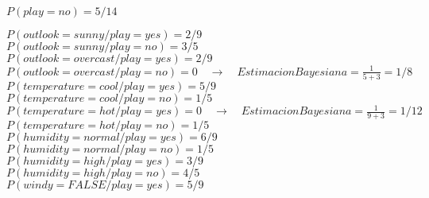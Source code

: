 \documentclass{article}
\begin{document}
\hspace{1cm} $P(play = no) = 5/14$ \\

\vspace{0.5cm}

\hspace{1cm} $P(outlook = sunny / play = yes) = 2/9 $ \\

\hspace{1cm} $P(outlook = sunny / play = no) =  3/5$ \\

\hspace{1cm} $P(outlook = overcast / play = yes) =  2/9$ \\

\hspace{1cm} $P(outlook = overcast / play = no) = 0 \quad {\rightarrow}\quad  Estimacion  Bayesiana = \frac{1}{5+3}=1/8$ \\

\hspace{1cm} $P(temperature = cool / play = yes) = 5/9 $ \\

\hspace{1cm} $P(temperature = cool  / play = no) = 1/5 $ \\

\hspace{1cm} $P(temperature = hot / play = yes) =  0 \quad \rightarrow \quad  Estimacion Bayesiana = \frac{1}{9+3} = 1/12$ \\

\hspace{1cm} $P(temperature = hot  / play = no) = 1/5 $ \\

\hspace{1cm} $P(humidity = normal / play = yes) = 6/9$ \\

\hspace{1cm} $P(humidity = normal / play = no) = 1/5 $ \\

\hspace{1cm} $P(humidity = high / play = yes) = 3/9$ \\

\hspace{1cm} $P(humidity = high / play = no) = 4/5 $ \\

\hspace{1cm} $P(windy = FALSE / play = yes) = 5/9 $ \\
\end{document}
